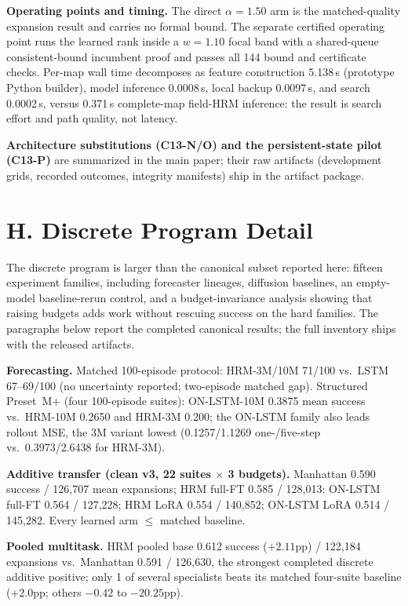 \documentclass[letterpaper]{article} %
\newcommand{\stage}[1]{\textsc{#1}}
\begin{document}
\textbf{Operating points and timing.} The direct $\alpha{=}1.50$ arm is the matched-quality expansion result and carries no formal bound. The separate certified operating point runs the learned rank inside a $w{=}1.10$ focal band with a shared-queue consistent-bound incumbent proof and passes all 144 bound and certificate checks. Per-map wall time decomposes as feature construction 5.138\,s (prototype Python builder), model inference 0.0008\,s, local backup 0.0097\,s, and search 0.0002\,s, versus 0.371\,s complete-map field-HRM inference: the result is search effort and path quality, not latency.

\textbf{Architecture substitutions (\stage{C13-N}/\stage{O}) and the persistent-state pilot (\stage{C13-P})} are summarized in the main paper; their raw artifacts (development grids, recorded outcomes, integrity manifests) ship in the artifact package.

\section{H. Discrete Program Detail}

The discrete program is larger than the canonical subset reported here: fifteen experiment families, including forecaster lineages, diffusion baselines, an empty-model baseline-rerun control, and a budget-invariance analysis showing that raising budgets adds work without rescuing success on the hard families. The paragraphs below report the completed canonical results; the full inventory ships with the released artifacts.

\textbf{Forecasting.} Matched 100-episode protocol: HRM-3M/10M 71/100 vs.\ LSTM 67--69/100 (no uncertainty reported; two-episode matched gap). Structured Preset~M+ (four 100-episode suites): ON-LSTM-10M 0.3875 mean success vs.\ HRM-10M 0.2650 and HRM-3M 0.200; the ON-LSTM family also leads rollout MSE, the 3M variant lowest (0.1257/1.1269 one-/five-step vs.\ 0.3973/2.6438 for HRM-3M).

\textbf{Additive transfer (clean v3, 22 suites $\times$ 3 budgets).} Manhattan 0.590 success / 126{,}707 mean expansions; HRM full-FT 0.585 / 128{,}013; ON-LSTM full-FT 0.564 / 127{,}228; HRM LoRA 0.554 / 140{,}852; ON-LSTM LoRA 0.514 / 145{,}282. Every learned arm $\leq$ matched baseline.

\textbf{Pooled multitask.} HRM pooled base 0.612 success ($+2.11$pp) / 122{,}184 expansions vs.\ Manhattan 0.591 / 126{,}630, the strongest completed discrete additive positive; only 1 of several specialists beats its matched four-suite baseline ($+2.0$pp; others $-0.42$ to $-20.25$pp).
\end{document}
